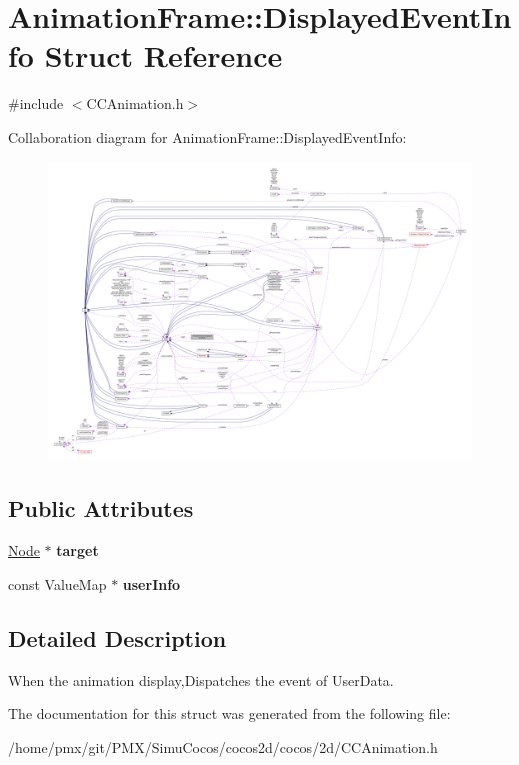 \hypertarget{structAnimationFrame_1_1DisplayedEventInfo}{}\section{Animation\+Frame\+:\+:Displayed\+Event\+Info Struct Reference}
\label{structAnimationFrame_1_1DisplayedEventInfo}


{\ttfamily \#include $<$C\+C\+Animation.\+h$>$}



Collaboration diagram for Animation\+Frame\+:\+:Displayed\+Event\+Info\+:
\nopagebreak
\begin{figure}[H]
\begin{center}
\leavevmode
\includegraphics[width=350pt]{structAnimationFrame_1_1DisplayedEventInfo__coll__graph}
\end{center}
\end{figure}
\subsection*{Public Attributes}
\begin{DoxyCompactItemize}
\item 
\mbox{\label{structAnimationFrame_1_1DisplayedEventInfo_ad21c9982e1b592355d8a3772531aac43}} 
\hyperlink{classNode}{Node} $\ast$ {\bfseries target}
\item 
\mbox{\label{structAnimationFrame_1_1DisplayedEventInfo_aae4388ae4cb75858d3ce023d5898111c}} 
const Value\+Map $\ast$ {\bfseries user\+Info}
\end{DoxyCompactItemize}


\subsection{Detailed Description}
When the animation display,Dispatches the event of User\+Data. 

The documentation for this struct was generated from the following file\+:\begin{DoxyCompactItemize}
\item 
/home/pmx/git/\+P\+M\+X/\+Simu\+Cocos/cocos2d/cocos/2d/C\+C\+Animation.\+h\end{DoxyCompactItemize}
